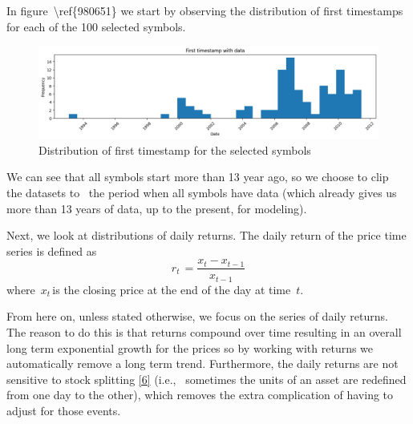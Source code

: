 \documentclass[10pt]{article}
\begin{document}
In figure~{\textbackslash ref\{980651\}} we start by observing the
distribution of first timestamps for each of the 100 selected symbols.
\begin{figure}[H]
\begin{center}
\includegraphics[width=0.98\columnwidth]{figures/output/output}
\caption{{Distribution of first timestamp for the selected symbols
{\label{980651}}%
}}
\end{center}
\end{figure}

We can see that all symbols start more than 13 year ago, so we choose to
clip~ the datasets to~ the period when all symbols have data (which
already gives us more than 13 years of data, up to the present, for
modeling).~

Next, we look at distributions of daily returns. The daily return of the
price time series is defined as~\[r_{t\ }=\frac{x_t-x_{t-1}}{x_{t-1}}\]
where~\(x_{t\ }\)is the closing price at the end of the day at
time~\(t\).

From here on, unless stated otherwise, we focus on the series of daily
returns. The reason to do this is that returns compound over time
resulting in an overall long term exponential growth for the prices so
by working with returns we automatically remove a long term trend.
Furthermore, the daily returns are not sensitive to stock splitting
\hyperref[csl:6]{[6]} (i.e.,~ sometimes the units of an asset are redefined
from one day to the other), which removes the extra complication of
having to adjust for those events.~
\end{document}
